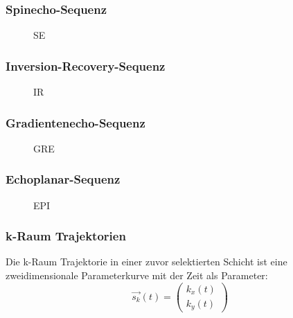 \subsubsection{Spinecho-Sequenz}

\begin{figure}[H]
	\centering
	\caption[SpinEcho Sequenz]{SE}
	\label{fig:SE}
\end{figure}

\subsubsection{Inversion-Recovery-Sequenz}

\begin{figure}[H]
	\centering
	\caption[SpinEcho Sequenz]{IR}
	\label{fig:IR}
\end{figure}

\subsubsection{Gradientenecho-Sequenz}

\begin{figure}[H]
	\centering
	\caption[Inversion Recovery Sequenz]{GRE}
	\label{fig:GRE}
\end{figure}

\subsubsection{Echoplanar-Sequenz}

\begin{figure}[H]
	\centering
	\caption[Echoplanar Sequenz]{EPI}
	\label{fig:EPI}
\end{figure}

\subsubsection{k-Raum Trajektorien}
Die k-Raum Trajektorie in einer zuvor selektierten Schicht ist eine zweidimensionale Parameterkurve mit der Zeit als Parameter:
\begin{equation}
	\vec{s_k}(t)=\begin{pmatrix}k_x(t) \\ k_y(t)\end{pmatrix}
\end{equation}

